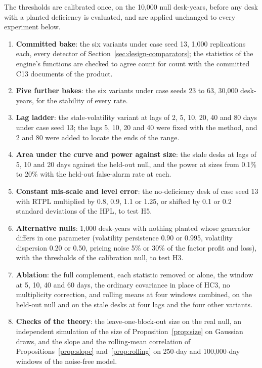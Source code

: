 The thresholds are calibrated once, on the 10,000 null desk-years, before any desk with a planted deficiency is evaluated, and are applied unchanged to every experiment below.
\begin{enumerate}
\item \textbf{Committed bake}: the six variants under case seed 13, 1,000 replications each, every detector of Section~\ref{sec:design-comparators}; the statistics of the engine's functions are checked to agree count for count with the committed C13 documents of the product.
\item \textbf{Five further bakes}: the six variants under case seeds 23 to 63, 30,000 desk-years, for the stability of every rate.
\item \textbf{Lag ladder}: the stale-volatility variant at lags of 2, 5, 10, 20, 40 and 80 days under case seed 13; the lags 5, 10, 20 and 40 were fixed with the method, and 2 and 80 were added to locate the ends of the range.
\item \textbf{Area under the curve and power against size}: the stale desks at lags of 5, 10 and 20 days against the held-out null, and the power at sizes from 0.1\% to 20\% with the held-out false-alarm rate at each.
\item \textbf{Constant mis-scale and level error}: the no-deficiency desk of case seed 13 with RTPL multiplied by 0.8, 0.9, 1.1 or 1.25, or shifted by 0.1 or 0.2 standard deviations of the HPL, to test H5.
\item \textbf{Alternative nulls}: 1,000 desk-years with nothing planted whose generator differs in one parameter (volatility persistence 0.90 or 0.995, volatility dispersion 0.20 or 0.50, pricing noise 5\% or 30\% of the factor profit and loss), with the thresholds of the calibration null, to test H3.
\item \textbf{Ablation}: the full complement, each statistic removed or alone, the window at 5, 10, 40 and 60 days, the ordinary covariance in place of HC3, no multiplicity correction, and rolling means at four windows combined, on the held-out null and on the stale desks at four lags and the four other variants.
\item \textbf{Checks of the theory}: the leave-one-block-out size on the real null, an independent simulation of the size of Proposition~\ref{prop:size} on Gaussian draws, and the slope and the rolling-mean correlation of Propositions~\ref{prop:slope} and~\ref{prop:rolling} on 250-day and 100,000-day windows of the noise-free model.
\end{enumerate}
